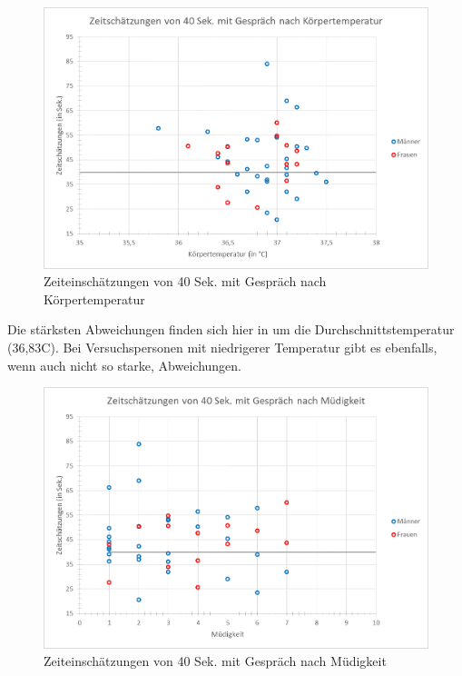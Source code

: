 \documentclass{Paper}
\begin{document}
\begin{figure}[H]
	\centering
	\includegraphics[scale=0.7]{../Diagramme/scatterPre/40mit_koerpertemperatur.png}
	\caption{Zeiteinschätzungen von 40 Sek. mit Gespräch nach Körpertemperatur}
	\label{img:temp40mit}
\end{figure}

Die stärksten Abweichungen finden sich hier in um die Durchschnittstemperatur (36,83\textdegree C).  Bei Versuchspersonen mit niedrigerer Temperatur gibt es ebenfalls, wenn auch nicht so starke, Abweichungen.





\begin{figure}[H]
	\centering
	\includegraphics[scale=0.7]{../Diagramme/scatterPre/40mit_muedigkeit.png}
	\caption{Zeiteinschätzungen von 40 Sek. mit Gespräch nach Müdigkeit}
	\label{img:mued40mit}
\end{figure}
\end{document}
